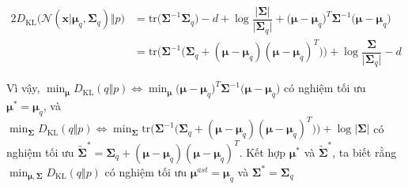 \documentclass[14pt, a4paper]{article}
\numberwithin{equation}{section}
\numberwithin{figure}{section}
\numberwithin{dl}{section}
\numberwithin{md}{section}
\numberwithin{bd}{section}
\numberwithin{dn}{section}
\numberwithin{hq}{section}
\begin{document}
    \begin{equation}
        \begin{aligned}
            2 D_{\mathrm{KL}} \big( \mathcal{N}(\boldsymbol{x} \vert \boldsymbol{\mu}_q, \boldsymbol{\Sigma}_q) \Vert p \big) &= \mathrm{tr} \big( \boldsymbol{\Sigma}^{-1} \boldsymbol{\Sigma}_q \big) - d + \log \dfrac{\lvert \boldsymbol{\Sigma} \rvert}{\lvert \boldsymbol{\Sigma}_q \rvert} + \big( \boldsymbol{\mu} - \boldsymbol{\mu}_q \big)^T \boldsymbol{\Sigma}^{-1} \big( \boldsymbol{\mu} - \boldsymbol{\mu}_q \big) \\
            &= \mathrm{tr} \Big( \boldsymbol{\Sigma}^{-1} \big( \boldsymbol{\Sigma}_q + (\boldsymbol{\mu} - \boldsymbol{\mu}_q) (\boldsymbol{\mu} - \boldsymbol{\mu}_q)^T \big) \Big) + \log \dfrac{\boldsymbol{\Sigma}}{\lvert \boldsymbol{\Sigma}_q \rvert} - d
        \end{aligned}
    \end{equation}

    Vì vậy, $\displaystyle\min_{\boldsymbol{\mu}} D_{\mathrm{KL}} (q \Vert p) \Leftrightarrow \displaystyle\min_{\boldsymbol{\mu}} \big (\boldsymbol{\mu} - \boldsymbol{\mu}_q \big )^T \boldsymbol{\Sigma}^{-1} \big (\boldsymbol{\mu} - \boldsymbol{\mu}_q \big )$ có nghiệm tối ưu $\boldsymbol{\mu}^{\ast} = \boldsymbol{\mu}_q$, và $\displaystyle \min_{\boldsymbol{\Sigma}} D_{\mathrm{KL}} (q \Vert p) \Leftrightarrow \displaystyle \min_{\boldsymbol{\Sigma}} \mathrm{tr} \Big( \boldsymbol{\Sigma}^{-1} \big( \boldsymbol{\Sigma}_q + (\boldsymbol{\mu} - \boldsymbol{\mu}_q) (\boldsymbol{\mu} - \boldsymbol{\mu}_q)^T \big) \Big) + \log \lvert \boldsymbol{\Sigma} \rvert$ có nghiệm tối ưu $\tilde{\boldsymbol{\Sigma}}^{\ast}=\boldsymbol{\Sigma}_q + (\boldsymbol{\mu} - \boldsymbol{\mu}_q)(\boldsymbol{\mu} - \boldsymbol{\mu}_q)^T$.
    Kết hợp $\boldsymbol{\mu}^{\ast}$ và $\tilde{\boldsymbol{\Sigma}}^{\ast}$, ta biết rằng $\displaystyle\min_{\boldsymbol{\mu}, \boldsymbol{\Sigma}} D_{\mathrm{KL}} (q \Vert p)$ có nghiệm tối ưu $\boldsymbol{\mu}^{ast}=\boldsymbol{\mu}_q$ và $\boldsymbol{\Sigma}^{\ast}=\boldsymbol{\Sigma}_q$
\end{document}
